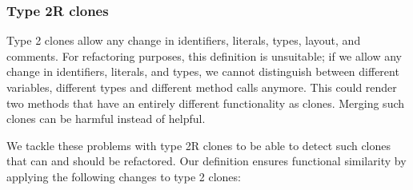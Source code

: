\documentclass[a4paper]{article}
\begin{document}
\subsubsection{Type 2R clones}
Type 2 clones allow any change in identifiers, literals, types, layout, and comments. For refactoring purposes, this definition is unsuitable; if we allow any change in identifiers, literals, and types, we cannot distinguish between different variables, different types and different method calls anymore. This could render two methods that have an entirely different functionality as clones. Merging such clones can be harmful instead of helpful.

We tackle these problems with type 2R clones to be able to detect such clones that can and should be refactored. Our definition ensures functional similarity by applying the following changes to type 2 clones:
\end{document}
